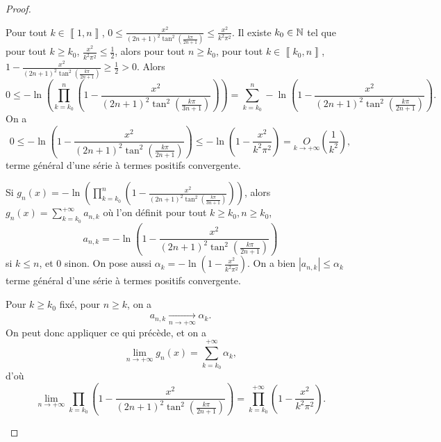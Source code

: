 \begin{proof}
\begin{enumerate}
    Pour tout $k\in\left\llbracket1,n\right\rrbracket$, $0\leqslant\frac{x^{2}}{(2n+1)^{2}\tan^{2}\left(\frac{k\pi}{2n+1}\right)}\leqslant\frac{x^{2}}{k^{2}\pi^{2}}$. Il existe $k_{0}\in\mathbb{N}$ tel que pour tout $k\geqslant k_{0}$, $\frac{x^{2}}{k^{2}\pi^{2}}\leqslant\frac{1}{2}$, alors pour tout $n\geqslant k_{0}$, pour tout $k\in\left\llbracket k_{0},n\right\rrbracket$, $1-\frac{x^{2}}{(2n+1)^{2}\tan^{2}\left(\frac{k\pi}{2n+1}\right)}\geqslant\frac{1}{2}>0$. Alors 
    \begin{equation}
        0\leqslant -\ln\left(\prod_{k=k_{0}}^{n}\left(1-\frac{x^{2}}{\left(2n+1\right)^{2}\tan^{2}\left(\frac{k\pi}{3n+1}\right)}\right)\right)=\sum_{k=k_{0}}^{n}-\ln\left(1-\frac{x^{2}}{(2n+1)^{2}\tan^{2}\left(\frac{k\pi}{2n+1}\right)}\right).
    \end{equation}
    On a 
    \begin{equation}
        0\leqslant-\ln\left(1-\frac{x^{2}}{(2n+1)^{2}\tan^{2}\left(\frac{k\pi}{2n+1}\right)}\right)\leqslant-\ln\left(1-\frac{x^{2}}{k^{2}\pi^{2}}\right)=\underset{k\to+\infty}{O}\left(\frac{1}{k^{2}}\right),
    \end{equation}
    terme général d'une série à termes positifs convergente.

    Si $g_{n}(x)=-\ln\left(\prod_{k=k_{0}}^{n}\left(1-\frac{x^{2}}{\left(2n+1\right)^{2}\tan^{2}\left(\frac{k\pi}{3n+1}\right)}\right)\right)$, alors $g_{n}(x)=\sum_{k=k_{0}}^{+\infty}a_{n,k}$ où l'on définit pour tout $k\geqslant k_{0},n\geqslant k_{0}$,
    \begin{equation}
        a_{n,k}=-\ln\left(1-\frac{x^{2}}{(2n+1)^{2}\tan^{2}\left(\frac{k\pi}{2n+1}\right)}\right)
    \end{equation}
    si $k\leqslant n$, et 0 sinon. On pose aussi $\alpha_{k}=-\ln\left(1-\frac{x^{2}}{k^{2}\pi^{2}}\right)$. On a bien $\left\lvert a_{n,k}\right\rvert\leqslant\alpha_{k}$ terme général d'une série à termes positifs convergente.

    Pour $k\geqslant k_{0}$ fixé, pour $n\geqslant k$, on a 
    \begin{equation}
        a_{n,k}\xrightarrow[n\to+\infty]{}\alpha_{k}.
    \end{equation}
    On peut donc appliquer ce qui précède, et on a 
    \begin{equation}
        \lim\limits_{n\to+\infty}g_{n}(x)=\sum_{k=k_{0}}^{+\infty}\alpha_{k},
    \end{equation}
    d'où
    \begin{equation}
        \lim\limits_{n\to+\infty}\prod_{k=k_{0}}\left(1-\frac{x^{2}}{(2n+1)^{2}\tan^{2}\left(\frac{k\pi}{2n+1}\right)}\right)=\prod_{k=k_{0}}^{+\infty}\left(1-\frac{x^{2}}{k^{2}\pi^{2}}\right).
    \end{equation}


\end{enumerate}
\end{proof}
